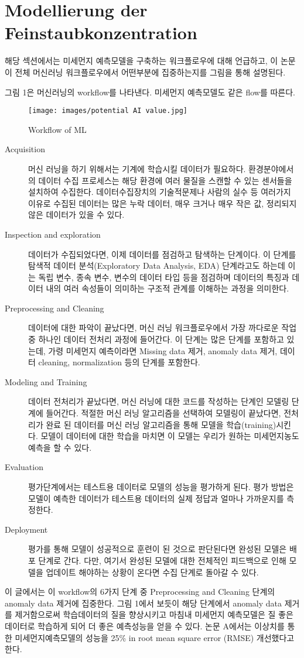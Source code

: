 \section{Modellierung der Feinstaubkonzentration}
해당 섹션에서는 미세먼지 예측모델을 구축하는 워크플로우에 대해 언급하고, 이 논문이 전체 머신러닝 워크플로우에서 어떤부분에 집중하는지를 그림을 통해 설명된다.

그림 1은 머신러닝의 workflow를 나타낸다. 미세먼지 예측모델도 같은 flow를 따른다.

\begin{figure}[h]
    \centering
    \texttt{[image: images/potential AI value.jpg]}
    \caption{Workflow of ML}
    \label{fig:Workflow}
\end{figure}

\begin{description}
    \item[Acquisition] {머신 러닝을 하기 위해서는 기계에 학습시킬 데이터가 필요하다. 환경분야에서의 데이터 수집 프로세스는 해당 환경에 여러 물질을 스캔할 수 있는 센서들을 설치하여 수집한다. 데이터수집장치의 기술적문제나 사람의 실수 등 여러가지 이유로 수집된 데이터는 많은 누락 데이터, 매우 크거나 매우 작은 값, 정리되지 않은 데이터가 있을 수 있다.}

    \item[Inspection and exploration] {데이터가 수집되었다면, 이제 데이터를 점검하고 탐색하는 단계이다. 이 단계를 탐색적 데이터 분석(Exploratory Data Analysis, EDA) 단계라고도 하는데 이는 독립 변수, 종속 변수, 변수의 데이터 타입 등을 점검하며 데이터의 특징과 데이터 내의 여러 속성들이 의미하는 구조적 관계를 이해하는 과정을 의미한다.}

    \item[Preprocessing and Cleaning] {데이터에 대한 파악이 끝났다면, 머신 러닝 워크플로우에서 가장 까다로운 작업 중 하나인 데이터 전처리 과정에 들어간다. 이 단계는 많은 단계를 포함하고 있는데, 가령 미세먼지 예측이라면 Missing data 제거, anomaly data 제거, 데이터 cleaning, normalization 등의 단계를 포함한다.}

    \item[Modeling and Training] {데이터 전처리가 끝났다면, 머신 러닝에 대한 코드를 작성하는 단계인 모델링 단계에 들어간다. 적절한 머신 러닝 알고리즘을 선택하여 모델링이 끝났다면, 전처리가 완료 된 데이터를 머신 러닝 알고리즘을 통해 모델을 학습(training)시킨다. 모델이 데이터에 대한 학습을 마치면 이 모델는 우리가 원하는 미세먼지농도 예측을 할 수 있다.}

    \item[Evaluation] {평가단계에서는 테스트용 데이터로 모델의 성능을 평가하게 된다. 평가 방법은 모델이 예측한 데이터가 테스트용 데이터의 실제 정답과 얼마나 가까운지를 측정한다.}

    \item[Deployment] {평가를 통해 모델이 성공적으로 훈련이 된 것으로 판단된다면 완성된 모델은 배포 단계로 간다. 다만, 여기서 완성된 모델에 대한 전체적인 피드백으로 인해 모델을 업데이트 해야하는 상황이 온다면 수집 단계로 돌아갈 수 있다.}   
\end{description}

이 글에서는 이 workflow의 6가지 단계 중 Preprocessing and Cleaning 단계의 anomaly data 제거에 집중한다. 그림 1에서 보듯이 해당 단계에서 anomaly data 제거를 제거함으로써 학습데이터의 질을 향상시키고 마침내 미세먼지 예측모델은 질 좋은 데이터로 학습하게 되어 더 좋은 예측성능을 얻을 수 있다. 논문 A에서는 이상치를 통한 미세먼지예측모델의 성능을 25\% in root mean square error (RMSE) 개선했다고 한다.